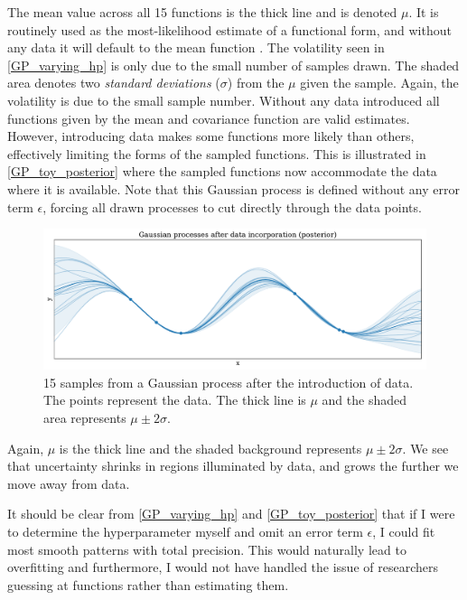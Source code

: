 \documentclass[a4paper]{article}
\begin{document}
The mean value across all 15 functions is the thick line and is denoted $\mu$. It is routinely used as the most-likelihood estimate of a functional form, and without any data it will default to the mean function \cite[3]{williams2006gaussian}. The volatility seen in \autoref{GP_varying_hp} is only due to the small number of samples drawn. The shaded area denotes two \emph{standard deviations} ($\sigma$) from the $\mu$ given the sample. Again, the volatility is due to the small sample number. Without any data introduced all functions given by the mean and covariance function are valid estimates. However, introducing data makes some functions more likely than others, effectively limiting the forms of the sampled functions. This is illustrated in \autoref{GP_toy_posterior} where the sampled functions now accommodate the data where it is available. Note that this Gaussian process is defined without any error term $\epsilon$, forcing all drawn processes to cut directly through the data points.\par  

\begin{figure}[!htb]
	\centering
	\includegraphics[scale=0.47]{GP_toy_posterior.pdf}
    \caption{\footnotesize{15 samples from a Gaussian process after the introduction of data. The points represent the data. The thick line is $\mu$ and the shaded area represents $\mu \pm 2\sigma$.}}\label{GP_toy_posterior}
\end{figure}

Again, $\mu$ is the thick line and the shaded background represents $\mu \pm 2\sigma$. We see that uncertainty shrinks in regions illuminated by data, and grows the further we move away from data.\par

It should be clear from \autoref{GP_varying_hp} and \autoref{GP_toy_posterior} that if I were to determine the hyperparameter myself and omit an error term $\epsilon$, I could fit most smooth patterns with total precision. This would naturally lead to overfitting and furthermore, I would not have handled the issue of researchers guessing at functions rather than estimating them.\par
\end{document}
